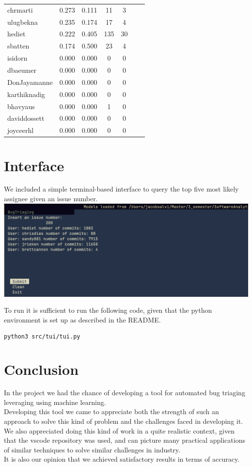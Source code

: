 \documentclass[tikz,10pt,fleqn]{article}
\begin{document}
\begin{table}[H]
\begin{tabular}{@{}lcccccc@{}}
        chrmarti       & 0.273 & 0.111  & 11  & 3   \\
        ulugbekna      & 0.235 & 0.174  & 17  & 4   \\
        hediet         & 0.222 & 0.405  & 135 & 30  \\
        sbatten        & 0.174 & 0.500  & 23  & 4   \\
        isidorn        & 0.000 & 0.000  & 0   & 0   \\
        dbaeumer       & 0.000 & 0.000  & 0   & 0   \\
        DonJayamanne   & 0.000 & 0.000  & 0   & 0   \\
        karthiknadig   & 0.000 & 0.000  & 0   & 0   \\
        bhavyaus       & 0.000 & 0.000  & 1   & 0   \\
        daviddossett   & 0.000 & 0.000  & 0   & 0   \\
        joyceerhl      & 0.000 & 0.000  & 0   & 0   \\ \bottomrule
    \end{tabular}
\end{table}

\section*{Interface}
We included a simple terminal-based interface to query the top five most likely assignee given an issue number.\\
\includegraphics[width=\textwidth]{./tui.png}

To run it is sufficient to run the following code, given that the python environment is set up as described in the README.
\begin{verbatim}
python3 src/tui/tui.py
\end{verbatim}

\section*{Conclusion}
In the project we had the chance of developing a tool for automated bug triaging leveraging using machine learning.\\
Developing this tool we came to appreciate both the strength of such an approach to solve this kind of problem and the challenges faced in developing it.\\
We also appreciated doing this kind of work in a quite realistic context, given that the vscode repository was used, and can picture many practical applications of similar techniques to solve similar challenges in industry.\\
It is also our opinion that we achieved satisfactory results in terms of accuracy.
\end{document}
